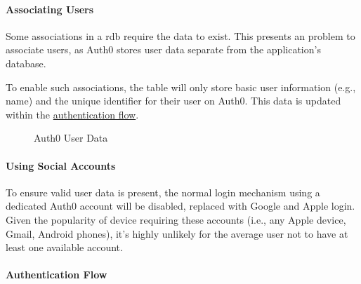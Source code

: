 
\paragraph{Associating Users}
Some associations in a \gls{rdb} require the data to exist.
This presents an problem to associate users, as Auth0
stores user data separate from the application's database.

To enable such associations, the  table will
only store basic user information (e.g., name) and the
unique identifier for their user on Auth0.
This data is updated within the
\hyperref[p:authFlow]{authentication flow}.

\begin{figure}
  
  \caption{Auth0 User Data}
  \label{fig:auth0Data}
\end{figure}

\paragraph{Using Social Accounts}
To ensure valid user data is present, the normal login
mechanism using a dedicated Auth0 account will be disabled,
replaced with Google and Apple login.
Given the popularity of device requiring these accounts
(i.e., any Apple device, Gmail, Android phones), it's
highly unlikely for the average user not to have at least
one available account.

\paragraph{Authentication Flow}
\label{p:authFlow}

